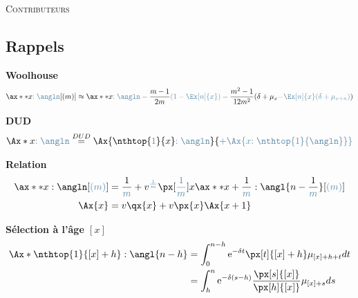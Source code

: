 \documentclass[10pt, french]{article}
\begin{document}
\begin{center}
	\textsc{\Large Contributeurs}\\[0.5cm] 
\end{center}


\newpage

\begin{multicols*}{2} 

\subsection*{Rappels}

\textbf{Woolhouse}
\begin{align*}
	\ax**{x\color{airforceblue}{:\angln}}[(m)]	
	&\approx	\ax**{x\textcolor{airforceblue}{:\angln}}	-	
		\frac{m - 1}{2m} \textcolor{airforceblue}{\left( 1 - \Ex[n]{x} \right)}	-	
		\frac{m^{2} - 1}{12m^{2}}(\delta + \mu_{x} \textcolor{airforceblue}{- \Ex[n]{x} (\delta + \mu_{x + n})})		\\
\end{align*}	

\textbf{DUD}
\begin{align*}
	\Ax*{x\textcolor{airforceblue}{:\angln}}
	&\overset{DUD}{=}	\Ax{\nthtop{\textcolor{airforceblue}{1}}{x}\textcolor{airforceblue}{:\angln}}		{\color{airforceblue} + \Ax{x\textcolor{airforceblue}{:\nthtop{1}{\angln}}}}	\\
\end{align*}

\textbf{Relation}
\begin{align*}
	\ax**{x:\angln}[\textcolor{airforceblue}{(m)}]
	&=	\frac{1}{\textcolor{airforceblue}{m}}	+
		v^{\textcolor{airforceblue}{\frac{1}{m}}} 
		\px[\textcolor{airforceblue}{\frac{1}{m}}]{x}
		\ax**{x + \frac{1}{\textcolor{airforceblue}{m}}:\angl{n - \frac{1}{\color{airforceblue}{m}}}}[\textcolor{airforceblue}{(m)}]	\\
	\Ax{x}	&=	v\qx{x} + v\px{x} \Ax{x + 1}	\\
\end{align*}

\textbf{Sélection à l'âge $[x]$}
\begin{align*}
	\Ax*{\nthtop{1}{[x] + h}:\angl{n - h}}
	&=	\int_{0}^{n - h} \textrm{e}^{-\delta t} \px[t]{[x] + h} \mu_{[x] + h + t} dt	\\
	&=	\int_{h}^{n} \textrm{e}^{-\delta (s - h)} \frac{\px[s]{[x]}}{\px[h]{[x]}} \mu_{[x] + s} ds
\end{align*}


\end{multicols*}
\end{document}
